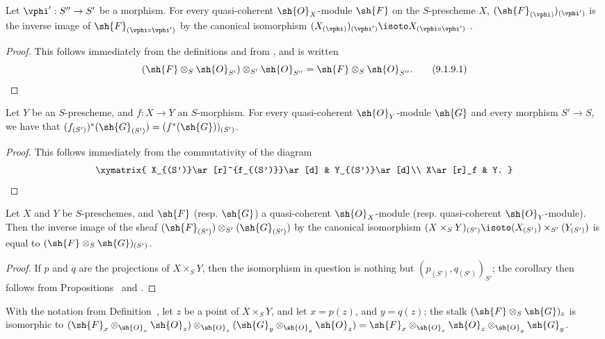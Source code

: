 \begin{proposition}[9.1.9]
\label{I.9.1.9}
Let $\vphi':S''\to S'$ be a morphism.
For every quasi-coherent $\sh{O}_X$-module $\sh{F}$ on the $S$-prescheme $X$,
$(\sh{F}_{(\vphi)})_{(\vphi')}$ is the inverse image of
$\sh{F}_{(\vphi\circ\vphi')}$ by the canonical isomorphism
$(X_{(\vphi)})_{(\vphi')}\isoto X_{(\vphi\circ\vphi')}$
.
\end{proposition}

\begin{proof}
This follows immediately from the definitions and from , and is
written
\[
\label{I.9.1.9.1}
  (\sh{F}\otimes_S\sh{O}_{S'})\otimes_{S'}\sh{O}_{S''}=\sh{F}\otimes_S\sh{O}_{S''}.
  \tag{9.1.9.1}
\]
\end{proof}

\begin{proposition}[9.1.10]
\label{I.9.1.10}
Let $Y$ be an $S$-prescheme, and $f:X\to Y$ an $S$-morphism.
For every quasi-coherent $\sh{O}_Y$-module $\sh{G}$ and every morphism
$S'\to S$, we have that
$(f_{(S')})^*(\sh{G}_{(S')})=(f^*(\sh{G}))_{(S')}$.
\end{proposition}

\begin{proof}
This follows immediately from the commutativity of the diagram
\[
  \xymatrix{
    X_{(S')}\ar[r]^{f_{(S')}}\ar[d] &
    Y_{(S')}\ar[d]\\
    X\ar[r]_f &
    Y.
  }
\]
\end{proof}

\begin{corollary}[9.1.11]
\label{I.9.1.11}
Let $X$ and $Y$ be $S$-preschemes, and
$\sh{F}$ (resp. $\sh{G}$) a quasi-coherent $\sh{O}_X$-module
(resp. quasi-coherent $\sh{O}_Y$-module). Then the inverse image of the sheaf
$(\sh{F}_{(S')})\otimes_{S'}(\sh{G}_{(S')})$ by the canonical isomorphism
$(X\times_S Y)_{(S')}\isoto(X_{(S')})\times_{S'}(Y_{(S')})$
 is equal to $(\sh{F}\otimes_S\sh{G})_{(S')}$.
\end{corollary}

\begin{proof}
If $p$ and $q$ are the projections of $X\times_S Y$, then the isomorphism in question
is nothing but $(p_{(S')}, q_{(S')})_{S'}$; the corollary then follows from
Propositions~ and .
\end{proof}

\begin{proposition}[9.1.12]
\label{I.9.1.12}
With the notation from Definition~, let $z$ be
a point of $X\times_S Y$, and let $x=p(z)$, and $y=q(z)$; the stalk
$(\sh{F}\otimes_S\sh{G})_z$ is isomorphic to
$(\sh{F}_x\otimes_{\sh{O}_x}\sh{O}_z)\otimes_{\sh{O}_z}(\sh{G}_y\otimes_{\sh{O}_y}\sh{O}_z)
  =\sh{F}_x\otimes_{\sh{O}_x}\sh{O}_z\otimes_{\sh{O}_y}\sh{G}_y$.
\end{proposition}

